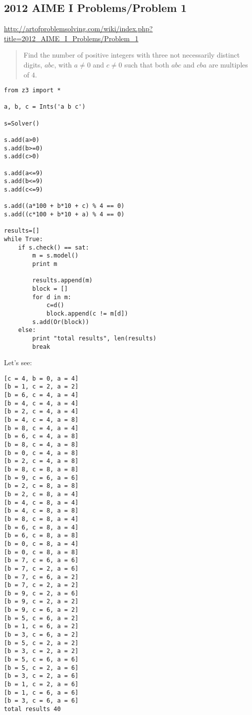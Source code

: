 \subsection{2012 AIME I Problems/Problem 1}

\url{http://artofproblemsolving.com/wiki/index.php?title=2012_AIME_I_Problems/Problem_1}

\begin{framed}
\begin{quotation}

Find the number of positive integers with three not necessarily distinct digits,
$abc$, with $a \neq 0$ and $c \neq 0$ such that both $abc$ and $cba$ are multiples of $4$.

\end{quotation}
\end{framed}

\begin{lstlisting}[style=custompy]
from z3 import *

a, b, c = Ints('a b c')

s=Solver()

s.add(a>0)
s.add(b>=0)
s.add(c>0)

s.add(a<=9)
s.add(b<=9)
s.add(c<=9)

s.add((a*100 + b*10 + c) % 4 == 0)
s.add((c*100 + b*10 + a) % 4 == 0)

results=[]
while True:
    if s.check() == sat:
        m = s.model()
        print m

        results.append(m)
        block = []
        for d in m:
            c=d()
            block.append(c != m[d])
        s.add(Or(block))
    else:
        print "total results", len(results)
        break
\end{lstlisting}

Let's see:

\begin{lstlisting}
[c = 4, b = 0, a = 4]
[b = 1, c = 2, a = 2]
[b = 6, c = 4, a = 4]
[b = 4, c = 4, a = 4]
[b = 2, c = 4, a = 4]
[b = 4, c = 4, a = 8]
[b = 8, c = 4, a = 4]
[b = 6, c = 4, a = 8]
[b = 8, c = 4, a = 8]
[b = 0, c = 4, a = 8]
[b = 2, c = 4, a = 8]
[b = 8, c = 8, a = 8]
[b = 9, c = 6, a = 6]
[b = 2, c = 8, a = 8]
[b = 2, c = 8, a = 4]
[b = 4, c = 8, a = 4]
[b = 4, c = 8, a = 8]
[b = 8, c = 8, a = 4]
[b = 6, c = 8, a = 4]
[b = 6, c = 8, a = 8]
[b = 0, c = 8, a = 4]
[b = 0, c = 8, a = 8]
[b = 7, c = 6, a = 6]
[b = 7, c = 2, a = 6]
[b = 7, c = 6, a = 2]
[b = 7, c = 2, a = 2]
[b = 9, c = 2, a = 6]
[b = 9, c = 2, a = 2]
[b = 9, c = 6, a = 2]
[b = 5, c = 6, a = 2]
[b = 1, c = 6, a = 2]
[b = 3, c = 6, a = 2]
[b = 5, c = 2, a = 2]
[b = 3, c = 2, a = 2]
[b = 5, c = 6, a = 6]
[b = 5, c = 2, a = 6]
[b = 3, c = 2, a = 6]
[b = 1, c = 2, a = 6]
[b = 1, c = 6, a = 6]
[b = 3, c = 6, a = 6]
total results 40
\end{lstlisting}

